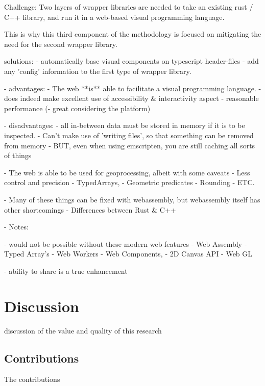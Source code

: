Challenge:
Two layers of wrapper libraries are needed to take an existing rust / C++ library, and run it in a web-based visual programming language.

This is why this third component of the methodology is focused on mitigating the need for the second wrapper library. 

solutions: 
- automatically base visual components on typescript header-files
- add any 'config' information to the first type of wrapper library. 


- advantages: 
  - The web **is** able to facilitate a visual programming language.
    - does indeed make excellent use of accessibility \& interactivity aspect
  - reasonable performance 
    (- great considering the platform)

- disadvantages: 
  - all in-between data must be stored in memory if it is to be inspected.
    - Can't make use of 'writing files', so that something can be removed from memory 
    - BUT, even when using emscripten, you are still caching all sorts of things

  - The web is able to be used for geoprocessing, albeit with some caveats
    - Less control and precision
    - TypedArrays,
    - Geometric predicates 
    - Rounding
    - ETC.

  - Many of these things can be fixed with webassembly, but webassembly itself has other shortcomings
    - Differences between Rust \& C++

 - Notes:

   - would not be possible without these modern web features
    - Web Assembly 
    - Typed Array's 
    - Web Workers
    - Web Components,
    - 2D Canvas API
    - Web GL

- ability to share is a true enhancement






\section{Discussion}
\label{sec:discussion}

discussion of the value and quality of this research


\subsection{Contributions}
\label{sec:contribution}

The contributions

